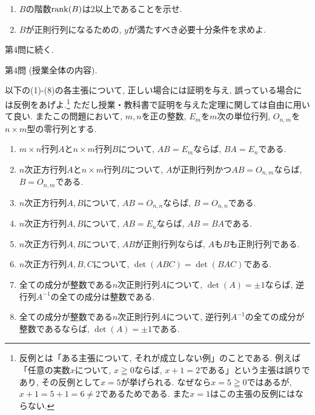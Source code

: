 \documentclass[dvipdfmx,a4paper,11pt]{article}
\theoremstyle{definition}
\begin{document}
  \begin{enumerate}
\renewcommand{\labelenumi}{(\arabic{enumi}).}
 \setlength{\parskip}{0cm} %
  \setlength{\itemsep}{0cm}
\item $B$の階数$\rank (B)$は2以上であることを示せ.
 


\item $B$が正則行列になるための, $y$が満たすべき必要十分条件を求めよ.
 \end{enumerate}
 
     \vspace{33pt} 
     
  \begin{flushright}
 {\LARGE 第4問に続く.}
 \end{flushright}

     
 \newpage
 
 {\Large 第4問}  (授業全体の内容).
 \vspace{11pt}
 
   以下の(1)-(8)の各主張について, 正しい場合には証明を与え, 誤っている場合には反例をあげよ.\footnote{反例とは「ある主張について, それが成立しない例」のことである. 例えば「任意の実数$x$について, $x \geqq 0$ならば, $x+1=2$である」という主張は誤りであり, その反例として$x=5$が挙げられる. なぜなら$x=5 \geqq0$ではあるが, $x+1 = 5 + 1 =6 \neq 2$であるためである. また$x=1$はこの主張の反例にはならない.}
   ただし授業・教科書で証明を与えた定理に関しては自由に用いて良い. またこの問題において, $m,n$を正の整数, $E_m$を$m$次の単位行列, $O_{n,m}$を$n\times m$型の零行列とする.
 \begin{enumerate}
\renewcommand{\labelenumi}{(\arabic{enumi}).}
 \setlength{\parskip}{0cm} %
  \setlength{\itemsep}{0cm}
 \item $m\times n$行列$A$と$n\times m$行列$B$について, $AB=E_m$ならば, $BA = E_n$である.
 \item $n$次正方行列$A$と$n\times m$行列$B$について, $A$が正則行列かつ$AB=O_{n,m}$ならば, $B=O_{n,m}$である.
  \item $n$次正方行列$A, B$について, $AB=O_{n,n}$ならば, $B=O_{n,n}$である.
  \item $n$次正方行列$A, B$について, $AB=E_n$ならば, $AB=BA$である.
   \item $n$次正方行列$A, B$について, $AB$が正則行列ならば, $A$も$B$も正則行列である.
 \item $n$次正方行列$A, B, C$について, $\det(ABC) = \det(BAC)$である.
 \item 全ての成分が整数である$n$次正則行列$A$について, $\det(A) =\pm1$ならば, 逆行列$A^{-1}$の全ての成分は整数である.
 \item 全ての成分が整数である$n$次正則行列$A$について, 逆行列$A^{-1}$の全ての成分が整数であるならば, $\det(A) =\pm1$である.

 \end{enumerate}
\end{document}
